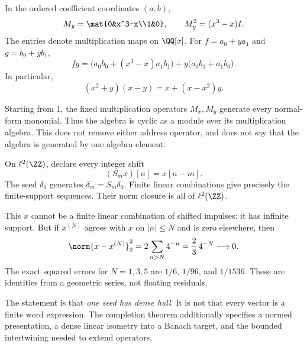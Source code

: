 
In the ordered coefficient coordinates $(a,b)$,
\[
M_y=\mat{0&x^3-x\\1&0},\qquad M_y^2=(x^3-x)I.
\]
The entries denote multiplication maps on $\QQ[x]$. For $f=a_0+ya_1$ and $g=b_0+yb_1$,
\[
fg=\bigl(a_0b_0+(x^3-x)a_1b_1\bigr)
+y\bigl(a_0b_1+a_1b_0\bigr).
\]
In particular,
\[
(x^2+y)(x-y)=x+(x-x^2)y.
\]

Starting from $1$, the fixed multiplication operators $M_x,M_y$ generate every normal-form monomial. Thus the algebra is cyclic as a module over its multiplication algebra. This does not remove either address operator, and does not say that the algebra is generated by one algebra element.


On $\ell^2(\ZZ)$, declare every integer shift
\[
(S_mx)[n]=x[n-m].
\]
The seed $\delta_0$ generates $\delta_m=S_m\delta_0$. Finite linear combinations give precisely the finite-support sequences. Their norm closure is all of $\ell^2(\ZZ)$.


This $x$ cannot be a finite linear combination of shifted impulses: it has infinite support. But if $x^{(N)}$ agrees with $x$ on $|n|\le N$ and is zero elsewhere, then
\[
\norm{x-x^{(N)}}_2^2
=2\sum_{n>N}4^{-n}
=\frac{2}{3}\,4^{-N}\longrightarrow0.
\]
The exact squared errors for $N=1,3,5$ are $1/6$, $1/96$, and $1/1536$. These are identities from a geometric series, not floating residuals.

The statement is that \emph{one seed has dense hull}. It is not that every vector is a finite word expression. The completion theorem additionally specifies a normed presentation, a dense linear isometry into a Banach target, and the bounded intertwining needed to extend operators.

